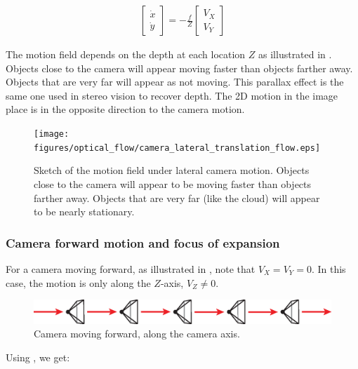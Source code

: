 \begin{align}
\begin{bmatrix}
\dot{x} \\
\dot{y}
\end{bmatrix}
= 
-\frac{f}{Z}
\begin{bmatrix}
 V_X \\
V_Y  
\end{bmatrix}
\end{align}

The motion field depends on the depth at each location $Z$ as illustrated in \fig{\ref{fig:camera_lateral_translation_flow}}. Objects close to the camera will appear moving faster than objects farther away. Objects that are very far will appear as not moving. This parallax effect is the same one used in stereo vision to recover depth. The 2D motion in the image place is in the opposite direction to the camera motion. 

\begin{figure}[h!]
\centerline{
\texttt{[image: figures/optical\_flow/camera\_lateral\_translation\_flow.eps]}
} 
\caption{Sketch of the motion field under lateral camera motion. Objects close to the camera will appear to be moving faster than objects farther away. Objects that are very far (like the cloud) will appear to be nearly stationary.}
\label{fig:camera_lateral_translation_flow}
\end{figure}

\subsubsection{Camera forward motion and focus of expansion}
For a camera moving forward, as illustrated in \fig{\ref{fig:camera_forward_translation}}, note that $V_X = V_Y = 0$. In this case, the motion is only along the $Z$-axis, $V_Z \neq 0$.

\begin{figure}[h!]
\centerline{
\includegraphics[width=1\linewidth]{figures/optical_flow/camera_forward_translation.eps}
} 
\caption{Camera moving forward, along the camera axis.}
\label{fig:camera_forward_translation}
\end{figure}

Using \eqn{\ref{eq:forward_objects}}, we get:


